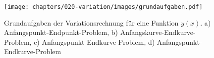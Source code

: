 %
%
%
\begin{figure}
\centering
\texttt{[image: chapters/020-variation/images/grundaufgaben.pdf]}
\caption{Grundaufgaben der Variationsrechnung für eine Funktion $y(x)$.
a) Anfangspunkt-Endpunkt-Problem,
%
b) Anfangskurve-Endkurve-Problem,
%
c) Anfangspunkt-Endkurve-Problem,
%
d) Anfangspunkt-Endkurve-Problem
%
\label{buch:variation:problem:fig:grundaufgaben}}
\end{figure}
